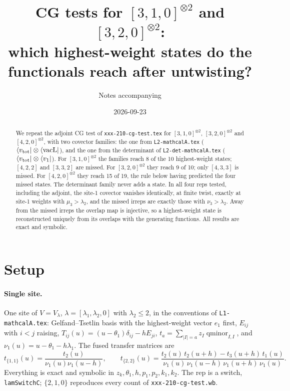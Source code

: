 \documentclass[11pt]{article}
\title{CG tests for $[3,1,0]^{\otimes2}$ and $[3,2,0]^{\otimes2}$:\\
which highest-weight states do the functionals reach after untwisting?}
\author{Notes accompanying \nb{xxx-310-cg-test.wb}}
\date{2026-09-23}
\newcommand{\vacL}{\langle\mathrm{vacL}|}
\newcommand{\nb}[1]{\texttt{#1}}
\theoremstyle{definition}
\theoremstyle{remark}
\begin{document}
\maketitle

\begin{abstract}
We repeat the adjoint CG test of \nb{xxx-210-cg-test.tex} for $[3,1,0]^{\otimes2}$, $[3,2,0]^{\otimes2}$ and $[4,2,0]^{\otimes2}$, with two covector families: the one from \nb{L2-mathcalA.tex} ($\langle v_{\rm tot}|\otimes\vacL$), and the one from the determinant of \nb{L2-det-mathcalA.tex} ($\langle v_{\rm tot}|\otimes\langle v_1|$). For $[3,1,0]^{\otimes2}$ the families reach 8 of the 10 highest-weight states; $[4,2,2]$ and $[3,3,2]$ are missed. For $[3,2,0]^{\otimes2}$ they reach 9 of 10; only $[4,3,3]$ is missed. For $[4,2,0]^{\otimes2}$ they reach 15 of 19, the rule below having predicted the four missed states. The determinant family never adds a state. In all four reps tested, including the adjoint, the site-1 covector vanishes identically, at finite twist, exactly at site-1 weights with $\mu_3>\lambda_2$, and the missed irreps are exactly those with $\nu_3>\lambda_2$. Away from the missed irreps the overlap map is injective, so a highest-weight state is reconstructed uniquely from its overlaps with the generating functions. All results are exact and symbolic.
\end{abstract}

\tableofcontents

\section{Setup}

\paragraph{Single site.}
One site of $V=V_\lambda$, $\lambda=[\lambda_1,\lambda_2,0]$ with $\lambda_2\le2$, in the conventions of \nb{L1-mathcalA.tex}: Gelfand--Tsetlin basis with the highest-weight vector $e_1$ first, $E_{ij}$ with $i<j$ raising, $T_{ij}(u)=(u-\theta_1)\delta_{ij}-hE_{ji}$, $t_a=\sum_{|I|=a}z_I\operatorname{qminor}_{I,I}$, and $\nu_1(u)=u-\theta_1-h\lambda_1$. The fused transfer matrices are
\begin{equation}
t_{\{1,1\}}(u)=\frac{t_2(u)}{\nu_1(u)\nu_1(u-h)},\qquad
t_{\{2,2\}}(u)=\frac{t_2(u)\,t_2(u+h)-t_3(u+h)\,t_1(u)}{\nu_1(u)\,\nu_1(u-h)\,\nu_1(u+h)\,\nu_1(u)} .
\end{equation}
Everything is exact and symbolic in $z_k,\theta_1,h,p_1,p_2,k_1,k_2$. The rep is a switch, \nb{lamSwitchC}; $\{2,1,0\}$ reproduces every count of \nb{xxx-210-cg-test.wb}.
\end{document}
